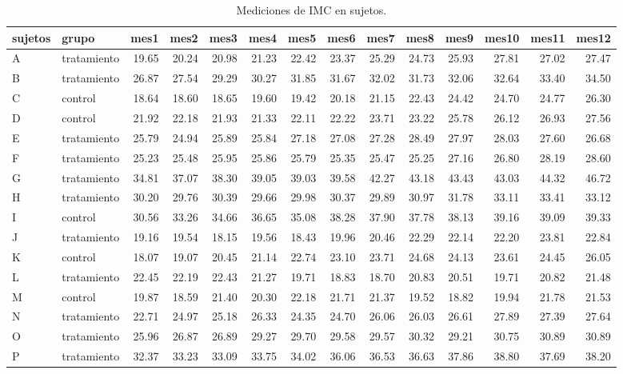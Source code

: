 \documentclass[]{article}
\begin{document}
\begin{table}[ht]
\centering
\begingroup\tiny
\begin{tabular}{llrrrrrrrrrrrr}
  \hline
sujetos & grupo & mes1 & mes2 & mes3 & mes4 & mes5 & mes6 & mes7 & mes8 & mes9 & mes10 & mes11 & mes12 \\ 
  \hline
A & tratamiento & 19.65 & 20.24 & 20.98 & 21.23 & 22.42 & 23.37 & 25.29 & 24.73 & 25.93 & 27.81 & 27.02 & 27.47 \\ 
  B & tratamiento & 26.87 & 27.54 & 29.29 & 30.27 & 31.85 & 31.67 & 32.02 & 31.73 & 32.06 & 32.64 & 33.40 & 34.50 \\ 
  C & control & 18.64 & 18.60 & 18.65 & 19.60 & 19.42 & 20.18 & 21.15 & 22.43 & 24.42 & 24.70 & 24.77 & 26.30 \\ 
  D & control & 21.92 & 22.18 & 21.93 & 21.33 & 22.11 & 22.22 & 23.71 & 23.22 & 25.78 & 26.12 & 26.93 & 27.56 \\ 
  E & tratamiento & 25.79 & 24.94 & 25.89 & 25.84 & 27.18 & 27.08 & 27.28 & 28.49 & 27.97 & 28.03 & 27.60 & 26.68 \\ 
  F & tratamiento & 25.23 & 25.48 & 25.95 & 25.86 & 25.79 & 25.35 & 25.47 & 25.25 & 27.16 & 26.80 & 28.19 & 28.60 \\ 
  G & tratamiento & 34.81 & 37.07 & 38.30 & 39.05 & 39.03 & 39.58 & 42.27 & 43.18 & 43.43 & 43.03 & 44.32 & 46.72 \\ 
  H & tratamiento & 30.20 & 29.76 & 30.39 & 29.66 & 29.98 & 30.37 & 29.89 & 30.97 & 31.78 & 33.11 & 33.41 & 33.12 \\ 
  I & control & 30.56 & 33.26 & 34.66 & 36.65 & 35.08 & 38.28 & 37.90 & 37.78 & 38.13 & 39.16 & 39.09 & 39.33 \\ 
  J & tratamiento & 19.16 & 19.54 & 18.15 & 19.56 & 18.43 & 19.96 & 20.46 & 22.29 & 22.14 & 22.20 & 23.81 & 22.84 \\ 
  K & control & 18.07 & 19.07 & 20.45 & 21.14 & 22.74 & 23.10 & 23.71 & 24.68 & 24.13 & 23.61 & 24.45 & 26.05 \\ 
  L & tratamiento & 22.45 & 22.19 & 22.43 & 21.27 & 19.71 & 18.83 & 18.70 & 20.83 & 20.51 & 19.71 & 20.82 & 21.48 \\ 
  M & control & 19.87 & 18.59 & 21.40 & 20.30 & 22.18 & 21.71 & 21.37 & 19.52 & 18.82 & 19.94 & 21.78 & 21.53 \\ 
  N & tratamiento & 22.71 & 24.97 & 25.18 & 26.33 & 24.35 & 24.70 & 26.06 & 26.03 & 26.61 & 27.89 & 27.39 & 27.64 \\ 
  O & tratamiento & 25.96 & 26.87 & 26.89 & 29.27 & 29.70 & 29.58 & 29.57 & 30.32 & 29.21 & 30.75 & 30.89 & 30.89 \\ 
  P & tratamiento & 32.37 & 33.23 & 33.09 & 33.75 & 34.02 & 36.06 & 36.53 & 36.63 & 37.86 & 38.80 & 37.69 & 38.20 \\ 
   \hline
\end{tabular}
\endgroup
\caption{Mediciones de IMC en sujetos.} 
\label{tab:sujetos}
\end{table}
\end{document}
